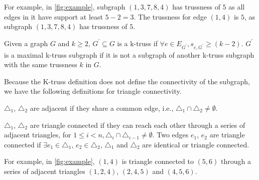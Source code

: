 For example, in \autoref{fig:example}, subgraph $(1,3,7,8,4)$ has trussness of $5$ as all edges in it have support at least $5-2=3$. The trussness for edge $(1,4)$ is $5$, as subgraph $(1,3,7,8,4)$ has trussness of $5$.

\begin{Def}[K-truss]
Given a graph $G$ and $k \ge 2$, $G^{\prime} \subseteq G$ is a k-truss if $\forall e \in E_{G^{\prime}}, s_{e,G^{\prime}} \ge (k - 2)$. 
$G^{\prime}$ is a maximal k-truss subgraph if it is not a subgraph of another k-truss subgraph with the same trussness $k$ in $G$.
\label{def:k-truss}
\end{Def}


Because the K-truss definition does not define the connectivity of the subgraph, we have the following definitions for triangle connectivity.

\begin{Def}
${\triangle}_{1}$, ${\triangle}_{2}$ are adjacent if they share a common edge, i.e., ${\triangle}_{1} \cap {\triangle}_{2} \neq \emptyset$. 
\label{def:triangle_adjacency}
\end{Def}

\begin{Def} 
${\triangle}_{1}$, ${\triangle}_{2}$ are triangle connected if they can reach each other through a series of adjacent triangles, \ie for $1 \le i < n, {\triangle}_{i} \cap {\triangle}_{i-1} \neq \emptyset$. Two edges $e_1$, $e_2$ are triangle connected if $\exists e_{1} \in {\triangle}_{1}$, $e_{2} \in {\triangle}_{2}$, ${\triangle}_{1}$ and ${\triangle}_{2}$ are identical or triangle connected.
\label{def:triangle_connectivity}
\end{Def}

For example, in \autoref{fig:example}, $(1,4)$ is triangle connected to $(5,6)$ through a series of adjacent triangles $(1,2,4)$, $(2,4,5)$ and $(4,5,6)$.



